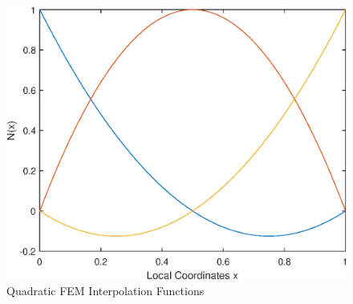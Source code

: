 \begin{figure}[htb!]
    \centering
    \includegraphics[width=.7\linewidth]{./homework2/img/3.eps}
    \caption{Quadratic FEM Interpolation Functions}
    \label{fig:interpol_functions}
\end{figure}

